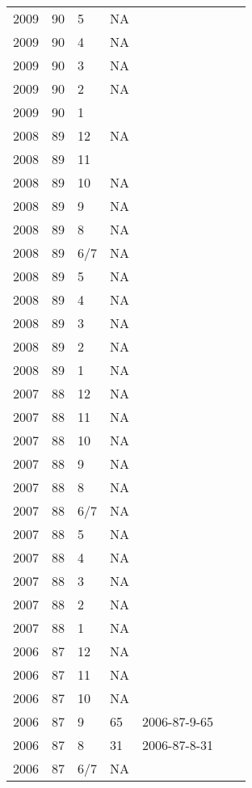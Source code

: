 \begin{longtable}{ |l|l|l|l|p{2.7cm}|l|p{2cm}| }
 2009 & 90 &     5 &      NA &  &  & \\
 2009 & 90 &     4 &      NA &  &  & \\
 2009 & 90 &     3 &      NA &  &  & \\
 2009 & 90 &     2 &      NA &  &  & \\
 2009 & 90 &     1 &         &  &  & \\
 2008 & 89 &    12 &      NA &  &  & \\
 2008 & 89 &    11 &         &  &  & \\
 2008 & 89 &    10 &      NA &  &  & \\
 2008 & 89 &     9 &      NA &  &  & \\
 2008 & 89 &     8 &      NA &  &  & \\
 2008 & 89 &   6/7 &      NA &  &  & \\
 2008 & 89 &     5 &      NA &  &  & \\
 2008 & 89 &     4 &      NA &  &  & \\
 2008 & 89 &     3 &      NA &  &  & \\
 2008 & 89 &     2 &      NA &  &  & \\
 2008 & 89 &     1 &      NA &  &  & \\
 2007 & 88 &    12 &      NA &  &  & \\
 2007 & 88 &    11 &      NA &  &  & \\
 2007 & 88 &    10 &      NA &  &  & \\
 2007 & 88 &     9 &      NA &  &  & \\
 2007 & 88 &     8 &      NA &  &  & \\
 2007 & 88 &   6/7 &      NA &  &  & \\
 2007 & 88 &     5 &      NA &  &  & \\
 2007 & 88 &     4 &      NA &  &  & \\
 2007 & 88 &     3 &      NA &  &  & \\
 2007 & 88 &     2 &      NA &  &  & \\
 2007 & 88 &     1 &      NA &  &  & \\
 2006 & 87 &    12 &      NA &  &  & \\
 2006 & 87 &    11 &      NA &  &  & \\
 2006 & 87 &    10 &      NA &  &  & \\
 2006 & 87 &     9 &      65 & 2006-87-9-65 &  & \\
 2006 & 87 &     8 &      31 & 2006-87-8-31 &  & \\
 2006 & 87 &   6/7 &      NA &  &  & \\

\end{longtable}
